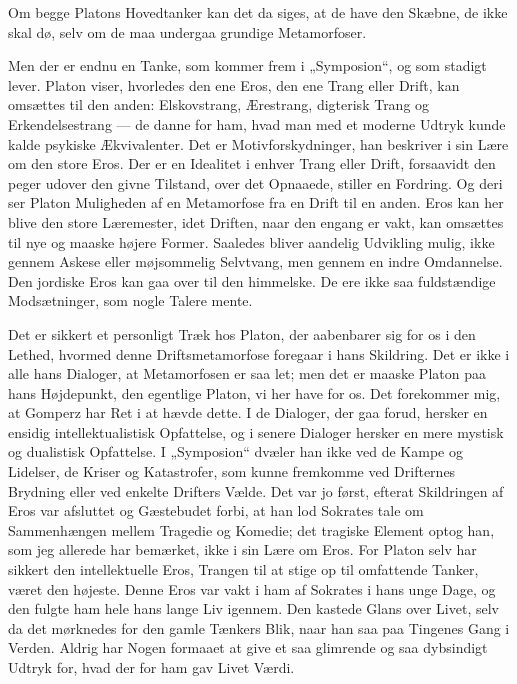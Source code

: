 \documentclass[12pt,a4paper,openany]{book}
\newcommand{\opage}[1]{\marginnote{\footnotesize\textit{[#1]}}}
\begin{document}
Om begge Platons Hovedtanker kan det da siges, at de have
den Skæbne, de ikke skal dø, selv om de maa undergaa grundige
Metamorfoser.

Men der er endnu en Tanke, som kommer frem i „Symposion“,
og som stadigt lever. Platon viser, hvorledes den ene
Eros, den ene Trang eller Drift, kan omsættes til den anden:
Elskovstrang, Ærestrang, digterisk Trang og Erkendelsestrang
--- de danne for ham, hvad man med et moderne Udtryk kunde
kalde psykiske Ækvivalenter. Det er Motivforskydninger, han
beskriver i sin Lære om den store Eros. Der er en Idealitet
i enhver Trang eller Drift, forsaavidt den peger udover den
givne Tilstand, over det Opnaaede, stiller en Fordring. Og deri
ser Platon Muligheden af en Metamorfose fra en Drift til en
anden. Eros kan her blive den store Læremester, idet Driften,
naar den engang er vakt, kan omsættes til nye og maaske
højere Former. Saaledes bliver aandelig Udvikling mulig, ikke
gennem Askese eller møjsommelig Selvtvang, men gennem en
\setcounter{footnote}{0}%
\opage{92}indre Omdannelse. Den jordiske Eros kan gaa over til den
himmelske. De ere ikke saa fuldstændige Modsætninger, som
nogle Talere mente.

Det er sikkert et personligt Træk hos Platon, der aabenbarer
sig for os i den Lethed, hvormed denne Driftsmetamorfose foregaar
i hans Skildring. Det er ikke i alle hans Dialoger, at Metamorfosen
er saa let; men det er maaske Platon paa hans Højdepunkt,
den egentlige Platon, vi her have for os. Det forekommer
mig, at Gomperz har Ret i at hævde dette. I de Dialoger, der
gaa forud, hersker en ensidig intellektualistisk Opfattelse, og i
senere Dialoger hersker en mere mystisk og dualistisk Opfattelse.
I „Symposion“ dvæler han ikke ved de Kampe og Lidelser,
de Kriser og Katastrofer, som kunne fremkomme ved Drifternes
Brydning eller ved enkelte Drifters Vælde. Det var jo først, efterat
Skildringen af Eros var afsluttet og Gæstebudet forbi, at han lod
Sokrates tale om Sammenhængen mellem Tragedie og Komedie;
det tragiske Element optog han, som jeg allerede har bemærket,
ikke i sin Lære om Eros. For Platon selv har sikkert den
intellektuelle Eros, Trangen til at stige op til omfattende Tanker,
været den højeste. Denne Eros var vakt i ham af Sokrates
i hans unge Dage, og den fulgte ham hele hans lange Liv
igennem. Den kastede Glans over Livet, selv da det mørknedes
for den gamle Tænkers Blik, naar han saa paa Tingenes Gang
i Verden. Aldrig har Nogen formaaet at give et saa glimrende
og saa dybsindigt Udtryk for, hvad der for ham gav Livet
Værdi.
\end{document}
